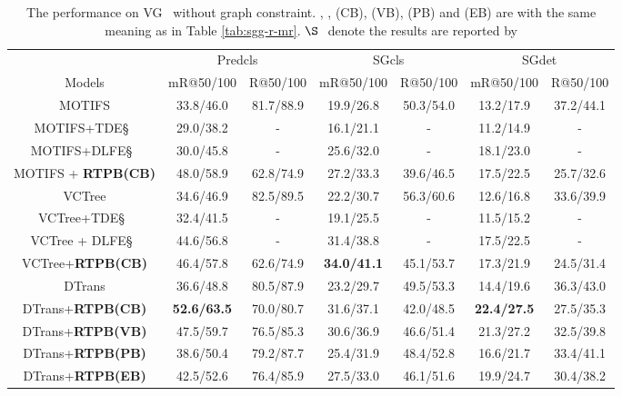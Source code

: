 \begin{table}[!ht]
	\centering
	\small
	\begin{tabular}{c|cc|cc|cc}
		\hline
		& \multicolumn{2}{c|}{Predcls}   & \multicolumn{2}{c|}{SGcls}     & \multicolumn{2}{c}{SGdet}     \\
		Models                                  & mR@50/100          & R@50/100  & mR@50/100          & R@50/100  & mR@50/100          & R@50/100  \\ \hline
		MOTIFS\dag\cite{Zellers_2018_CVPR}      & 33.8/46.0          & 81.7/88.9 & 19.9/26.8          & 50.3/54.0 & 13.2/17.9          & 37.2/44.1 \\
		MOTIFS+TDE\S~\cite{Tang2020_unbiased}      & 29.0/38.2          & -         & 16.1/21.1          & -         & 11.2/14.9          & -         \\
		MOTIFS+DLFE\S~\cite{chiou2021recovering}   & 30.0/45.8          & -         & 25.6/32.0          & -         & 18.1/23.0          & -         \\
		MOTIFS + \textbf{RTPB(CB)}              & 48.0/58.9          & 62.8/74.9 & 27.2/33.3          & 39.6/46.5 & 17.5/22.5          & 25.7/32.6 \\ \hline
		VCTree\dag\cite{VCTree_tang}            & 34.6/46.9          & 82.5/89.5 & 22.2/30.7          & 56.3/60.6 & 12.6/16.8          & 33.6/39.9 \\
		VCTree+TDE\S~\cite{Tang2020_unbiased}      & 32.4/41.5          & -         & 19.1/25.5          & -         & 11.5/15.2          & -         \\
		VCTree + DLFE\S~\cite{chiou2021recovering} & 44.6/56.8          & -         & 31.4/38.8          & -         & 17.5/22.5          & -         \\
		VCTree+\textbf{RTPB(CB)  }              & 46.4/57.8          & 62.6/74.9 & \textbf{34.0/41.1} & 45.1/53.7 & 17.3/21.9          & 24.5/31.4 \\ \hline
		DTrans                                  & 36.6/48.8          & 80.5/87.9 & 23.2/29.7          & 49.5/53.3 & 14.4/19.6          & 36.3/43.0 \\
		DTrans+\textbf{RTPB(CB) }               & \textbf{52.6/63.5} & 70.0/80.7 & 31.6/37.1          & 42.0/48.5 & \textbf{22.4/27.5} & 27.5/35.3 \\
		DTrans+\textbf{RTPB(VB)}                & 47.5/59.7          & 76.5/85.3 & 30.6/36.9          & 46.6/51.4 & 21.3/27.2          & 32.5/39.8 \\
		DTrans+\textbf{RTPB(PB)}                & 38.6/50.4          & 79.2/87.7 & 25.4/31.9          & 48.4/52.8 & 16.6/21.7          & 33.4/41.1 \\
		DTrans+\textbf{RTPB(EB)}                & 42.5/52.6          & 76.4/85.9 & 27.5/33.0          & 46.1/51.6 & 19.9/24.7          & 30.4/38.2 \\ \hline
	\end{tabular}
	\caption{ The performance on VG~\cite{krishna2016visual} without graph constraint. \dag, \ddag, (CB), (VB), (PB) and (EB) are with the same meaning as in Table \ref{tab:sgg-r-mr}. $\S~$ denote the results are reported by \cite{chiou2021recovering} 
	}
	\label{tab:sgg-r-mr-ng}
\end{table}
